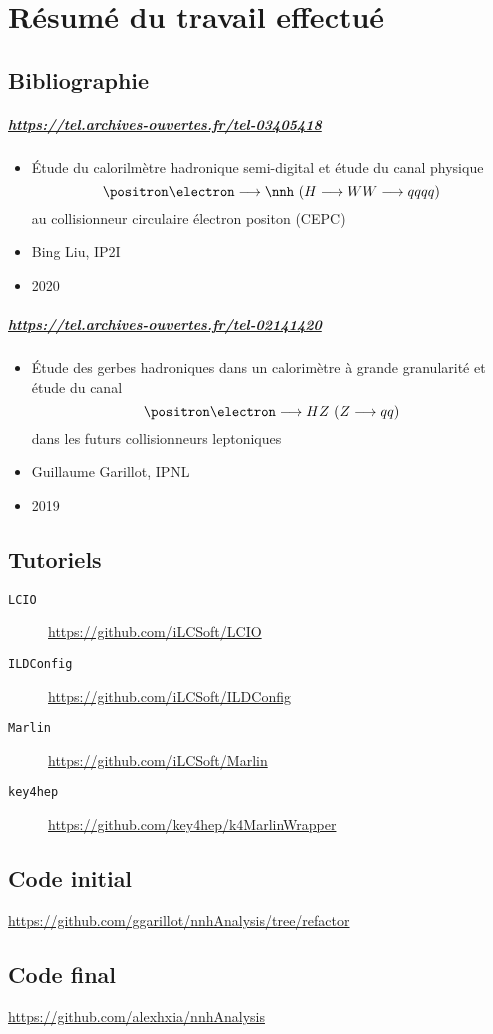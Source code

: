 

\chapter{Résumé du travail effectué}

\section{Bibliographie}

\paragraph{\url{https://tel.archives-ouvertes.fr/tel-03405418}}
\begin{itemize}
	\item Étude du calorilmètre hadronique semi-digital et étude du canal physique 
	$$ \positron \electron \longrightarrow \nnh \ (H \longrightarrow WW \longrightarrow qqqq)$$ 
	au collisionneur circulaire électron positon (CEPC) 
	\item Bing Liu, IP2I
	\item 2020
\end{itemize}

\paragraph{\url{https://tel.archives-ouvertes.fr/tel-02141420}}
\begin{itemize}
	\item Étude des gerbes hadroniques dans un calorimètre à grande granularité et étude du canal $$ \positron \electron \longrightarrow HZ \ (Z \longrightarrow qq) $$ dans les futurs collisionneurs leptoniques
	\item Guillaume Garillot, IPNL
	\item 2019
\end{itemize}

\section{Tutoriels}

\begin{description}
	\item[\texttt{LCIO}] \url{https://github.com/iLCSoft/LCIO}
	\item[\texttt{ILDConfig}] \url{https://github.com/iLCSoft/ILDConfig}
	\item[\texttt{Marlin}] \url{https://github.com/iLCSoft/Marlin}
	\item[\texttt{key4hep}] \url{https://github.com/key4hep/k4MarlinWrapper}
\end{description}

\section{Code initial}

\url{https://github.com/ggarillot/nnhAnalysis/tree/refactor}

\section{Code final}

\url{https://github.com/alexhxia/nnhAnalysis}